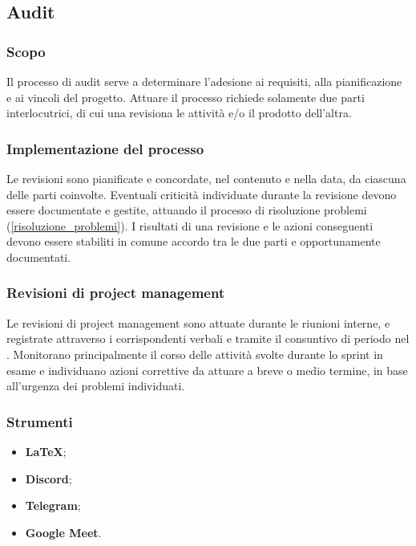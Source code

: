 \subsection{Audit}\label{audit}

\subsubsection{Scopo}
\par Il processo di audit serve a determinare l'adesione ai requisiti, alla pianificazione e ai vincoli del progetto. Attuare il processo richiede solamente due parti interlocutrici, di cui una revisiona le attività e/o il prodotto dell'altra.

\subsubsection{Implementazione del processo}
\par Le revisioni sono pianificate e concordate, nel contenuto e nella data, da ciascuna delle parti coinvolte. Eventuali criticità individuate durante la revisione devono essere documentate e gestite, attuando il processo di risoluzione problemi (\ref{risoluzione_problemi}). I risultati di una revisione e le azioni conseguenti devono essere stabiliti in comune accordo tra le due parti e opportunamente documentati.

\subsubsection{Revisioni di project management}
\par Le revisioni di project management sono attuate durante le riunioni interne, e registrate attraverso i corrispondenti verbali e tramite il consuntivo di periodo nel \PdP. Monitorano principalmente il corso delle attività svolte durante lo sprint in esame e individuano azioni correttive da attuare a breve o medio termine, in base all'urgenza dei problemi individuati.

\subsubsection{Strumenti}
\IntroStrumenti
\begin{itemize}
  \item \textbf{LaTeX};
  \item \textbf{Discord};
  \item \textbf{Telegram};
  \item \textbf{Google Meet}.
\end{itemize}